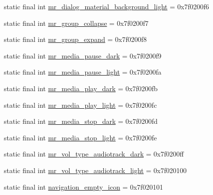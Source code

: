 \begin{CompactItemize}
\item 
static final int \hyperlink{classandroid_1_1support_1_1v7_1_1cardview_1_1_r_1_1drawable_5d20b35026aa85e8c0f19a62d7155763}{mr\_\-dialog\_\-material\_\-background\_\-light} = 0x7f0200f6
\item 
static final int \hyperlink{classandroid_1_1support_1_1v7_1_1cardview_1_1_r_1_1drawable_c0e769522bc41e5fda4c5b4c3bf6f73d}{mr\_\-group\_\-collapse} = 0x7f0200f7
\item 
static final int \hyperlink{classandroid_1_1support_1_1v7_1_1cardview_1_1_r_1_1drawable_c9be6df557ca5ba5432d151c1cfc6e4e}{mr\_\-group\_\-expand} = 0x7f0200f8
\item 
static final int \hyperlink{classandroid_1_1support_1_1v7_1_1cardview_1_1_r_1_1drawable_f300a8f07e209bdf31fe0b1ecff56866}{mr\_\-media\_\-pause\_\-dark} = 0x7f0200f9
\item 
static final int \hyperlink{classandroid_1_1support_1_1v7_1_1cardview_1_1_r_1_1drawable_016ba88afb8b7060551747d6e15cc73c}{mr\_\-media\_\-pause\_\-light} = 0x7f0200fa
\item 
static final int \hyperlink{classandroid_1_1support_1_1v7_1_1cardview_1_1_r_1_1drawable_69c3c995c3d9dd05f6b1fc18d88f42c3}{mr\_\-media\_\-play\_\-dark} = 0x7f0200fb
\item 
static final int \hyperlink{classandroid_1_1support_1_1v7_1_1cardview_1_1_r_1_1drawable_0ccf957b9ccfc1182c3075435bee8fe8}{mr\_\-media\_\-play\_\-light} = 0x7f0200fc
\item 
static final int \hyperlink{classandroid_1_1support_1_1v7_1_1cardview_1_1_r_1_1drawable_9484297923bd0bcbf432d2fe0463fe6b}{mr\_\-media\_\-stop\_\-dark} = 0x7f0200fd
\item 
static final int \hyperlink{classandroid_1_1support_1_1v7_1_1cardview_1_1_r_1_1drawable_4b8d1796816122ea8aa1b083d918bb9a}{mr\_\-media\_\-stop\_\-light} = 0x7f0200fe
\item 
static final int \hyperlink{classandroid_1_1support_1_1v7_1_1cardview_1_1_r_1_1drawable_3da36bb4f682f1da73bee3b083585e90}{mr\_\-vol\_\-type\_\-audiotrack\_\-dark} = 0x7f0200ff
\item 
static final int \hyperlink{classandroid_1_1support_1_1v7_1_1cardview_1_1_r_1_1drawable_4f5daae943c3e61f3d20bd12491ea6f1}{mr\_\-vol\_\-type\_\-audiotrack\_\-light} = 0x7f020100
\item 
static final int \hyperlink{classandroid_1_1support_1_1v7_1_1cardview_1_1_r_1_1drawable_a6cee31609aa3b96bf3e8a69dd702771}{navigation\_\-empty\_\-icon} = 0x7f020101
\item 

\end{CompactItemize}

